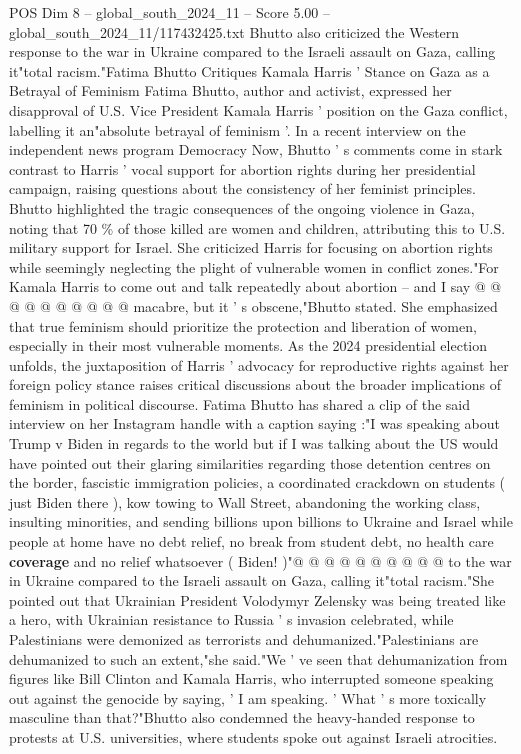 \begin{textsample}{POS Dim 8 – global\_south\_2024\_11 – Score 5.00 – global\_south\_2024\_11/117432425.txt}  \label{ex:f8_pos_152}
Bhutto also criticized the Western response to the war in Ukraine compared to the Israeli assault on Gaza, calling it"total racism."Fatima Bhutto Critiques Kamala Harris ' Stance on Gaza as a Betrayal of Feminism Fatima Bhutto, author and activist, expressed her disapproval of U.S.
Vice President Kamala Harris ' position on the Gaza conflict, labelling it an"absolute betrayal of feminism '.
In a recent interview on the independent news program Democracy Now, Bhutto ' s comments come in stark contrast to Harris ' vocal support for abortion rights during her presidential campaign, raising questions about the consistency of her feminist principles.
Bhutto highlighted the tragic consequences of the ongoing violence in Gaza, noting that 70 \% of those killed are women and children, attributing this to U.S. military support for Israel.
She criticized Harris for focusing on abortion rights while seemingly neglecting the plight of vulnerable women in conflict zones."For Kamala Harris to come out and talk repeatedly about abortion -- and I say @ @ @ @ @ @ @ @ @ @ macabre, but it ' s obscene,"Bhutto stated.
She emphasized that true feminism should prioritize the protection and liberation of women, especially in their most vulnerable moments.
As the 2024 presidential election unfolds, the juxtaposition of Harris ' advocacy for reproductive rights against her foreign policy stance raises critical discussions about the broader implications of feminism in political discourse.
Fatima Bhutto has shared a clip of the said interview on her Instagram handle with a caption saying :"I was speaking about Trump v Biden in regards to the world but if I was talking about the US would have pointed out their glaring similarities regarding those detention centres on the border, fascistic immigration policies, a coordinated crackdown on students ( just Biden there ), kow towing to Wall Street, abandoning the working class, insulting minorities, and sending billions upon billions to Ukraine and Israel while people at home have no debt relief, no break from student debt, no health care \textbf{coverage} and no relief whatsoever ( Biden! )"@ @ @ @ @ @ @ @ @ @ to the war in Ukraine compared to the Israeli assault on Gaza, calling it"total racism."She pointed out that Ukrainian President Volodymyr Zelensky was being treated like a hero, with Ukrainian resistance to Russia ' s invasion celebrated, while Palestinians were demonized as terrorists and dehumanized."Palestinians are dehumanized to such an extent,"she said."We ' ve seen that dehumanization from figures like Bill Clinton and Kamala Harris, who interrupted someone speaking out against the genocide by saying, ' I am speaking. ' What ' s more toxically masculine than that?"Bhutto also condemned the heavy-handed response to protests at U.S. universities, where students spoke out against Israeli atrocities.

\end{textsample}
